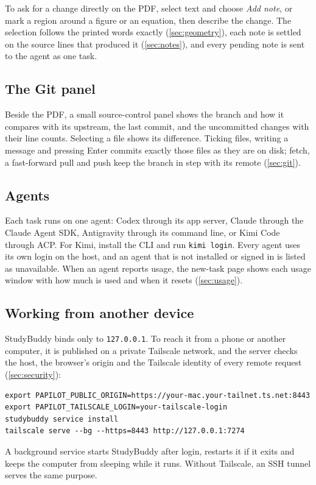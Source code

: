 To ask for a change directly on the PDF, select text and choose \emph{Add note},
or mark a region around a figure or an equation, then describe the change. The
selection follows the printed words exactly (\cref{sec:geometry}), each note is
settled on the source lines that produced it (\cref{sec:notes}), and every
pending note is sent to the agent as one task.

\subsection{The Git panel}

Beside the PDF, a small source-control panel shows the branch and how it
compares with its upstream, the last commit, and the uncommitted changes with
their line counts. Selecting a file shows its difference. Ticking files,
writing a message and pressing Enter commits exactly those files as they are on
disk; fetch, a fast-forward pull and push keep the branch in step with its
remote (\cref{sec:git}).

\subsection{Agents}

Each task runs on one agent: Codex through its app server, Claude through the
Claude Agent SDK, Antigravity through its command line, or Kimi Code through
ACP. For Kimi, install the CLI and run \texttt{kimi login}. Every agent uses its
own login on the host, and an agent that is not installed or signed in is listed
as unavailable. When an agent reports usage, the new-task page shows each usage
window with how much is used and when it resets (\cref{sec:usage}).

\subsection{Working from another device}

StudyBuddy binds only to \texttt{127.0.0.1}. To reach it from a phone or another
computer, it is published on a private Tailscale network, and the server checks
the host, the browser's origin and the Tailscale identity of every remote
request (\cref{sec:security}):
\begin{verbatim}
export PAPILOT_PUBLIC_ORIGIN=https://your-mac.your-tailnet.ts.net:8443
export PAPILOT_TAILSCALE_LOGIN=your-tailscale-login
studybuddy service install
tailscale serve --bg --https=8443 http://127.0.0.1:7274
\end{verbatim}
A background service starts StudyBuddy after login, restarts it if it exits and
keeps the computer from sleeping while it runs. Without Tailscale, an SSH
tunnel serves the same purpose.

